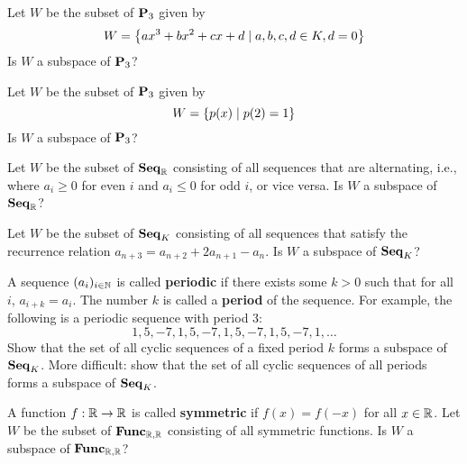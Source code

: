 \begin{ex}
  Let $W$ be the subset of\/ $\mathbf{P}_3$ given by
  \begin{equation*}
    W = \left\{ ax^3 + bx^2 + cx + d \mid a,b,c,d \in K, d = 0 \right\}
  \end{equation*}
  Is $W$ a subspace of $\mathbf{P}_3$?
\end{ex}

\begin{ex}
  Let $W$ be the subset of\/ $\mathbf{P}_3$ given by
  \begin{equation*}
    W = \left\{ p(x) \mid p(2) = 1 \right\}
  \end{equation*}
  Is $W$ a subspace of $\mathbf{P}_3$?
\end{ex}

\begin{ex}
  Let $W$ be the subset of $\mathbf{Seq}_{\mathbb{R}}$ consisting of all sequences
  that are alternating, i.e., where $a_i\geq 0$ for even $i$ and
  $a_i\leq 0$ for odd $i$, or vice versa. Is $W$ a subspace of
  $\mathbf{Seq}_{\mathbb{R}}$?
\end{ex}

\begin{ex}
  Let $W$ be the subset of $\mathbf{Seq}_{K}$ consisting of all sequences that
  satisfy the recurrence relation
  $a_{n+3} = a_{n+2} + 2a_{n+1} - a_{n}$. Is $W$ a subspace of
  $\mathbf{Seq}_{K}$?
\end{ex}

\begin{ex}
  A sequence $(a_i)_{i\in\mathbb{N}}$ is called \textbf{periodic}%
   if there exists some $k>0$ such that for
  all $i$, $a_{i+k}=a_i$. The number $k$ is called a \textbf{period}
  of the sequence. For example, the following is a periodic sequence
  with period $3$:
  \begin{equation*}
    1,5,-7,1,5,-7,1,5,-7,1,5,-7,1,\ldots
  \end{equation*}
  Show that the set of all cyclic sequences of a
  fixed period $k$ forms a subspace of $\mathbf{Seq}_K$. More difficult: show
  that the set of all cyclic sequences of all periods forms a subspace
  of $\mathbf{Seq}_K$.
\end{ex}

\begin{ex}
  A function $f:\mathbb{R}\to\mathbb{R}$ is called \textbf{symmetric}%
   if $f(x)=f(-x)$ for all $x\in\mathbb{R}$.  Let
  $W$ be the subset of $\mathbf{Func}_{\mathbb{R},\mathbb{R}}$ consisting of all symmetric
  functions. Is $W$ a subspace of $\mathbf{Func}_{\mathbb{R},\mathbb{R}}$?
\end{ex}

